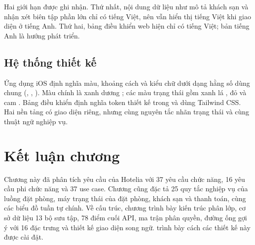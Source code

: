 Hai giới hạn được ghi nhận. Thứ nhất, nội dung dữ liệu như mô tả khách sạn và nhận xét biên tập phần lớn chỉ có tiếng Việt, nên vẫn hiển thị tiếng Việt khi giao diện ở tiếng Anh. Thứ hai, bảng điều khiển web hiện chỉ có tiếng Việt; bản tiếng Anh là hướng phát triển.

\subsection{Hệ thống thiết kế}

Ứng dụng iOS định nghĩa màu, khoảng cách và kiểu chữ dưới dạng hằng số dùng chung (, , ). Màu chính là xanh dương ; các màu trạng thái gồm xanh lá , đỏ  và cam . Bảng điều khiển định nghĩa token thiết kế trong  và dùng Tailwind CSS. Hai nền tảng có giao diện riêng, nhưng cùng nguyên tắc nhãn trạng thái và cùng thuật ngữ nghiệp vụ.

\section{Kết luận chương}

Chương này đã phân tích yêu cầu của Hotelia với 37 yêu cầu chức năng, 16 yêu cầu phi chức năng và 37 use case. Chương cũng đặc tả 25 quy tắc nghiệp vụ của luồng đặt phòng, máy trạng thái của đặt phòng, khách sạn và thanh toán, cùng các biểu đồ tuần tự chính. Về cấu trúc, chương trình bày kiến trúc phân lớp, cơ sở dữ liệu 13 bộ sưu tập, 78 điểm cuối API, ma trận phân quyền, đường ống gợi ý với 16 đặc trưng và thiết kế giao diện song ngữ.  trình bày cách các thiết kế này được cài đặt.
